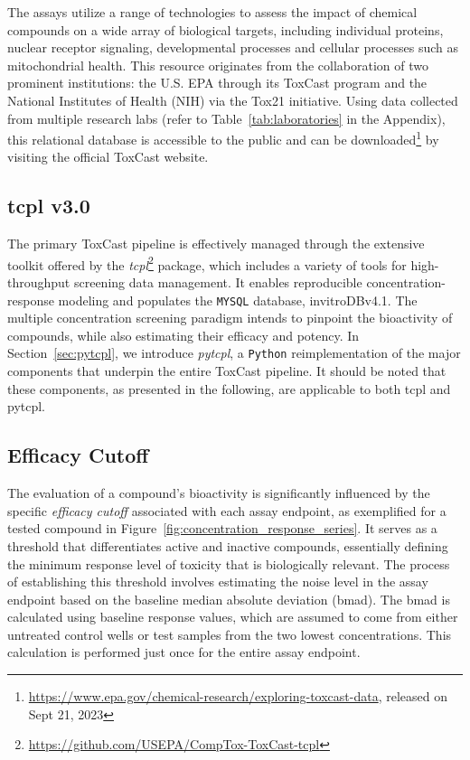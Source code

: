 The assays utilize a range of technologies to assess the impact of chemical compounds on a wide array of biological targets, including individual proteins, nuclear receptor signaling, developmental processes and cellular processes such as mitochondrial health. This resource originates from the collaboration of two prominent institutions: the  U.S. EPA through its ToxCast program and the National Institutes of Health (NIH) via the Tox21 initiative. Using data collected from multiple research labs (refer to Table~\ref{tab:laboratories} in the Appendix), this relational database is accessible to the public and can be downloaded\footnote{\url{https://www.epa.gov/chemical-research/exploring-toxcast-data}, released on Sept 21, 2023} by visiting the official ToxCast website.

\subsection{tcpl v3.0}
The primary ToxCast pipeline is effectively managed through the extensive toolkit offered by the \emph{tcpl}\footnote{\url{https://github.com/USEPA/CompTox-ToxCast-tcpl}} package, which includes a variety of tools for high-throughput screening data management. It enables reproducible concentration-response modeling and populates the \texttt{MYSQL} database, invitroDBv4.1. The multiple concentration screening paradigm intends to pinpoint the bioactivity of compounds, while also estimating their efficacy and potency. In Section~\ref{sec:pytcpl}, we introduce \emph{pytcpl}, a \texttt{Python} reimplementation of the major components that underpin the entire ToxCast pipeline. It should be noted that these components, as presented in the following, are applicable to both tcpl and pytcpl.

\subsection{Efficacy Cutoff}
The evaluation of a compound's bioactivity is significantly influenced by the specific \emph{efficacy cutoff} associated with each assay endpoint, as exemplified for a tested compound in Figure~\ref{fig:concentration_response_series}. It serves as a threshold that differentiates active and inactive compounds, essentially defining the minimum response level of toxicity that is biologically relevant. The process of establishing this threshold involves estimating the noise level in the assay endpoint based on the baseline median absolute deviation (bmad). The bmad is calculated using baseline response values, which are assumed to come from either untreated control wells or test samples from the two lowest concentrations. This calculation is performed just once for the entire assay endpoint.


